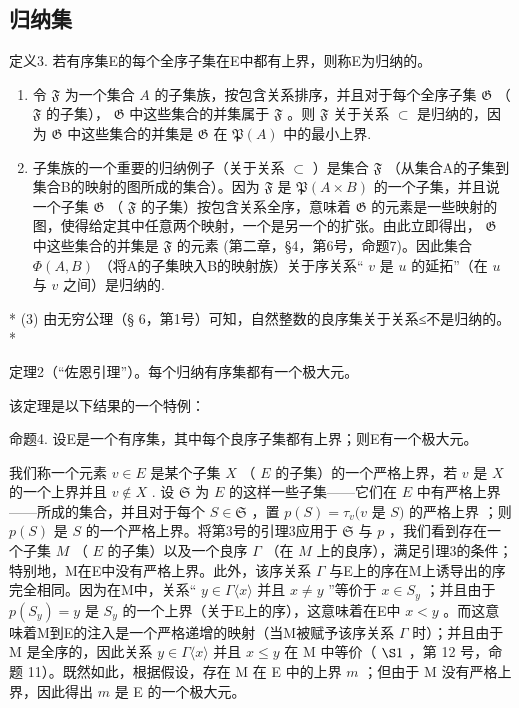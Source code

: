\subsection{归纳集}

定义3. 若有序集E的每个全序子集在E中都有上界，则称E为归纳的。


\begin{enumerate}
\def\labelenumi{(\arabic{enumi})}
\item
  令 \(\mathfrak{F}\) 为一个集合 \(A\) 的子集族，按包含关系排序，并且对于每个全序子集 \(\mathfrak{G}\) （ \(\mathfrak{F}\) 的子集）， \(\mathfrak{G}\) 中这些集合的并集属于 \(\mathfrak{F}\) 。则 \(\mathfrak{F}\) 关于关系 \(\subset\) 是归纳的，因为 \(\mathfrak{G}\) 中这些集合的并集是 \(\mathfrak{G}\) 在 \(\mathfrak{P}(A)\) 中的最小上界.
\item
  子集族的一个重要的归纳例子（关于关系 \(\subset\) ）是集合 \(\mathfrak{F}\) （从集合A的子集到集合B的映射的图所成的集合）。因为 \(\mathfrak{F}\) 是 \(\mathfrak{P}(A \times B)\) 的一个子集，并且说一个子集 \(\mathfrak{G}\) （ \(\mathfrak{F}\) 的子集）按包含关系全序，意味着 \(\mathfrak{G}\) 的元素是一些映射的图，使得给定其中任意两个映射，一个是另一个的扩张。由此立即得出， \(\mathfrak{G}\) 中这些集合的并集是 \(\mathfrak{F}\) 的元素 (第二章，§4，第6号，命题7)。因此集合 \(\Phi(A, B)\) （将A的子集映入B的映射族）关于序关系“ \(v\) 是 \(u\) 的延拓”（在 \(u\) 与 \(v\) 之间）是归纳的.
\end{enumerate}

* (3) 由无穷公理（§ 6，第1号）可知，自然整数的良序集关于关系≤不是归纳的。 *

定理2（“佐恩引理”）。每个归纳有序集都有一个极大元。

该定理是以下结果的一个特例：

命题4. 设E是一个有序集，其中每个良序子集都有上界；则E有一个极大元。

我们称一个元素 \(v \in E\) 是某个子集 \(X\) （ \(E\) 的子集）的一个严格上界，若 \(v\) 是 \(X\) 的一个上界并且 \(v \notin X\) . 设 \(\mathfrak{S}\) 为 \(E\) 的这样一些子集——它们在 \(E\) 中有严格上界——所成的集合，并且对于每个 \(S \in \mathfrak{S}\) ，置 \(p(S) = \tau_v(v\) 是 \(S)\) 的严格上界 ；则 \(p(S)\) 是 \(S\) 的一个严格上界。将第3号的引理3应用于 \(\mathfrak{S}\) 与 \(p\) ，我们看到存在一个子集 \(M\) （ \(E\) 的子集）以及一个良序 \(\Gamma\) （在 \(M\) 上的良序），满足引理3的条件；特别地，M在E中没有严格上界。此外，该序关系 \(\Gamma\) 与E上的序在M上诱导出的序完全相同。因为在M中，关系“ \(y \in \Gamma\langle x \rangle\) 并且 \(x \neq y\) ”等价于 \(x \in S_y\) ；并且由于 \(p(S_y) = y\) 是 \(S_y\) 的一个上界（关于E上的序），这意味着在E中 \(x < y\) 。而这意味着M到E的注入是一个严格递增的映射（当M被赋予该序关系 \(\Gamma\) 时）；并且由于 M 是全序的，因此关系 \(y \in \Gamma\langle x \rangle\) 并且 \(x \leqslant y\) 在 M 中等价（ \(\S 1\) ，第 12 号，命题 11）。既然如此，根据假设，存在 M 在 E 中的上界 \(m\) ；但由于 M 没有严格上界，因此得出 \(m\) 是 E 的一个极大元。

